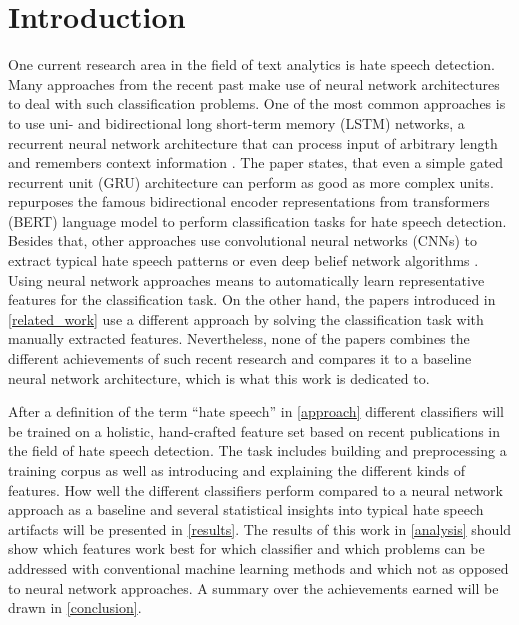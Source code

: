 \section{Introduction}

One current research area in the field of text analytics is hate speech detection. Many approaches from the recent past make use of neural network architectures to deal with such classification problems. One of the most common approaches is to use uni- and bidirectional long short-term memory (LSTM) networks, a recurrent neural network architecture that can process input of arbitrary length and remembers context information \cite{Dorris2020, Syam2019, Saksesi2018}. The paper \cite{Founta2019} states, that even a simple gated recurrent unit (GRU) architecture can perform as good as more complex units. \cite{Saleh2020} repurposes the famous bidirectional encoder representations from transformers (BERT) language model to perform clas\-si\-fi\-ca\-tion tasks for hate speech detection. Besides that, other approaches use con\-vo\-lu\-tional neural networks (CNNs) to extract typical hate speech patterns \cite{Badjatiya2017, Roy2020, Kapil2020} or even deep belief network algorithms \cite{Muhammad2020}. Using neural network approaches means to automatically learn representative features for the classification task. On the other hand, the papers introduced in \autoref{related_work} use a different approach by solving the classification task with manually extracted features. Nevertheless, none of the papers combines the different achievements of such recent research and compares it to a baseline neural network architecture, which is what this work is dedicated to.

After a definition of the term \enquote{hate speech} in \autoref{approach} different classifiers will be trained on a holistic, hand-crafted feature set based on recent pub\-li\-ca\-tions in the field of hate speech detection. The task includes building and pre\-pro\-cess\-ing a training corpus as well as introducing and explaining the different kinds of features. How well the different classifiers perform compared to a neural network approach as a baseline and several statistical insights into typical hate speech artifacts will be presented in \autoref{results}. The results of this work in \autoref{analysis} should show which features work best for which classifier and which problems can be addressed with conventional machine learning methods and which not as opposed to neural network approaches. A summary over the achievements earned will be drawn in \autoref{conclusion}.
